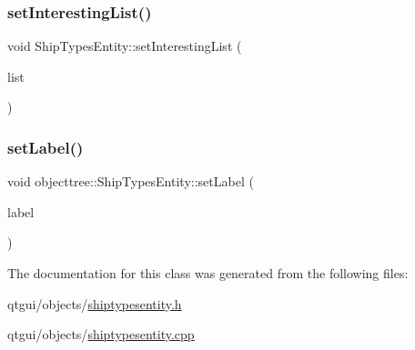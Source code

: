 \subsubsection{\texorpdfstring{setInterestingList()}{setInterestingList()}}
{\footnotesize\ttfamily void Ship\+Types\+Entity\+::set\+Interesting\+List (\begin{DoxyParamCaption}\item[{std\+::shared\+\_\+ptr$<$ \mbox{\hyperlink{class_interesting_list_with_special_values}{Interesting\+List\+With\+Special\+Values}}$<$ int $>$$>$}]{list }\end{DoxyParamCaption})}

\mbox{\label{classobjecttree_1_1_ship_types_entity_ac40817aba400c67e0f6c6790fde9644d}} 
\subsubsection{\texorpdfstring{setLabel()}{setLabel()}}
{\footnotesize\ttfamily void objecttree\+::\+Ship\+Types\+Entity\+::set\+Label (\begin{DoxyParamCaption}\item[{Q\+String}]{label }\end{DoxyParamCaption})\hspace{0.3cm}{\ttfamily [inline]}}



The documentation for this class was generated from the following files\+:\begin{DoxyCompactItemize}
\item 
qtgui/objects/\mbox{\hyperlink{shiptypesentity_8h}{shiptypesentity.\+h}}\item 
qtgui/objects/\mbox{\hyperlink{shiptypesentity_8cpp}{shiptypesentity.\+cpp}}\end{DoxyCompactItemize}
